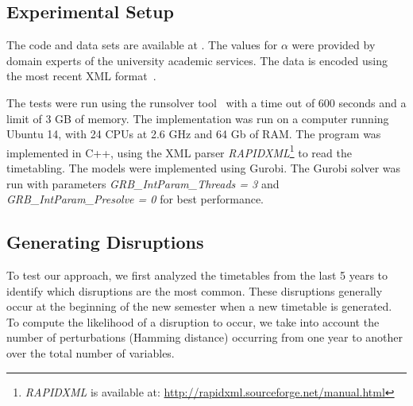 \documentclass[runningheads]{llncs}
\begin{document}
\subsection{Experimental Setup}
The code and data sets are available at .
The values for $\alpha$ were provided by domain experts of the university academic services. The data is encoded using the most recent XML format~\cite{itc-2019}. %



The tests were run using the runsolver tool~\cite{runsolver} with a time out of 600 seconds and a limit of 3 GB of memory. The implementation was run on a computer running Ubuntu 14, with 24 CPUs at 2.6 GHz and 64 Gb of RAM. The program was implemented in C++, using the XML parser \textit{RAPIDXML}\footnote{\textit{RAPIDXML} is available at: \url{http://rapidxml.sourceforge.net/manual.html}} to read the timetabling. The models were implemented using Gurobi\cite{gurobi}. The Gurobi solver was run with parameters \textit{GRB\_IntParam\_Threads = 3} and \textit{GRB\_IntParam\_Presolve = 0} for best performance.


\subsection{Generating Disruptions}

To test our approach, we first analyzed the timetables from the last 5 years to identify which disruptions are the most common. These disruptions generally occur at the beginning of the new semester when a new timetable is generated. To compute the likelihood of a disruption to occur, we take into account the number of perturbations (Hamming distance) occurring from one year to another over the total number of variables.  
\end{document}
